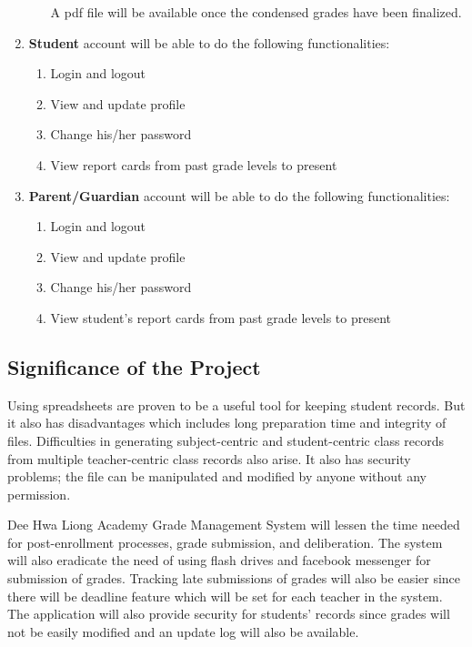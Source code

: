 \documentclass[11pt,a4paper,titlepage]{article}
\begin{document}
\begin{enumerate}
\begin{enumerate}
        A pdf file will be available once the condensed grades have been finalized.
    \end{enumerate}
    \item \textbf{Student} account will be able to do the following functionalities: 
    \begin{enumerate}
        \item Login and logout
        \item View and update profile
        \item Change his/her password
        \item View report cards from past grade levels to present
    \end{enumerate}
    \item \textbf{Parent/Guardian} account will be able to do the following functionalities:
    \begin{enumerate}
        \item Login and logout
        \item View and update profile
        \item Change his/her password
        \item View student's report cards from past grade levels to present
    \end{enumerate}


\end{enumerate}

\subsection{Significance of the Project}
Using spreadsheets are proven to be a useful tool for keeping student records. But it also has disadvantages which includes long preparation time and integrity of files. Difficulties in generating subject-centric and student-centric class records from multiple teacher-centric class records also arise. It also has security problems; the file can be manipulated and modified by anyone without any permission.

Dee Hwa Liong Academy Grade Management System will lessen the time needed for post-enrollment processes, grade submission, and deliberation. The system will also eradicate the need of using flash drives and facebook messenger for submission of grades. Tracking late submissions of grades will also be easier since there will be deadline feature which will be set for each teacher in the system. The application will also provide security for students' records since grades will not be easily modified and an update log will also be available.
\end{document}
